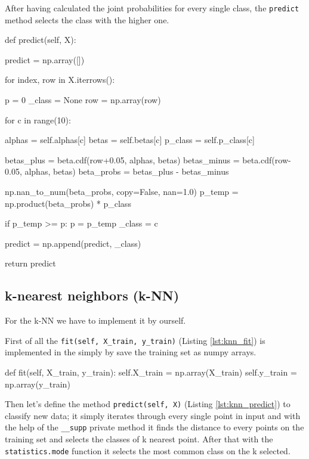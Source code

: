 \documentclass[12pt]{article}
\begin{document}
After having calculated the joint probabilities for every single class, the 
\verb|predict| method selects the class with the higher one.

\begin{python}[caption={Random forests},label={lst:random_forests}]
def predict(self, X):

    predict = np.array([])

    for index, row in X.iterrows():

        p = 0
        _class = None
        row = np.array(row)

        for c in range(10):

            alphas = self.alphas[c]
            betas = self.betas[c]
            p_class = self.p_class[c]
            
            betas_plus = beta.cdf(row+0.05, alphas, betas)
            betas_minus = beta.cdf(row-0.05, alphas, betas)
            beta_probs = betas_plus - betas_minus
            
            np.nan_to_num(beta_probs, copy=False, nan=1.0)
            p_temp = np.product(beta_probs) * p_class
            

            if p_temp >= p:
                p = p_temp
                _class = c
        
        predict = np.append(predict, _class)
    
    return predict
\end{python}


\subsection{k-nearest neighbors (k-NN)}

For the k-NN we have to implement it by ourself. 

First of all the \verb|fit(self, X_train, y_train)| (Listing \ref{lst:knn_fit}) 
is implemented in the simply
by save the training set as numpy arrays.

\begin{python}[caption={k-NN fit method},label={lst:knn_fit}]
def fit(self, X_train, y_train):
    self.X_train = np.array(X_train)
    self.y_train = np.array(y_train)
\end{python}

Then let's define the method \verb|predict(self, X)| (Listing \ref{lst:knn_predict}) 
to classify new data; it simply iterates through every single point in input and 
with the help of the \verb|__supp| private method it finds the distance to every 
points on the training set and selects the classes of k nearest point. 
After that with the \verb|statistics.mode| function it selects the most common 
class on the k selected.
\end{document}
